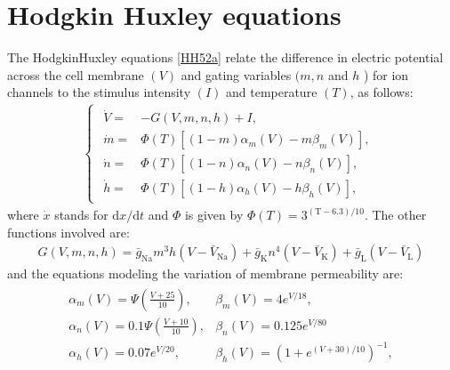 \documentclass[letterpaper,10pt,english]{jupyterBook}
\begin{document}
\chapter{Hodgkin Huxley equations}
\label{\detokenize{HodgkinHuxley:hodgkin-huxley-equations}}\label{\detokenize{HodgkinHuxley::doc}}
\sphinxAtStartPar
The Hodgkin\sphinxhyphen{}Huxley equations {[}\hyperlink{cite.references:id18}{HH52a}{]} relate the
difference in electric potential across the cell membrane \((V)\) and gating
variables \((m, n\) and \(h\) ) for ion channels to the stimulus intensity \((I)\)
and temperature \((T)\), as follows:
\begin{equation}\label{equation:HodgkinHuxley:eq:HHequations}
\begin{split}\begin{cases}
\begin{aligned}
\dot{V} ={}& -G(V, m, n, h)+I, \\
\dot{m} ={}& \Phi(T)\left[(1-m) \alpha_{m}(V)-m \beta_{m}(V)\right], \\
\dot{n} ={}& \Phi(T)\left[(1-n) \alpha_{n}(V)-n \beta_{n}(V)\right], \\
\dot{h} ={}& \Phi(T)\left[(1-h) \alpha_{h}(V)-h \beta_{h}(V)\right],
\end{aligned}
\end{cases}\end{split}
\end{equation}
\sphinxAtStartPar
where \(\dot{x}\) stands for \(\mathrm{d} x / \mathrm{d} t\) and \(\Phi\) is
given by \(\Phi(T)=3^{(\mathrm{T}-6.3) / 10}\). The other functions involved
are:
\begin{equation*}
\begin{split}
G(V, m, n, h)=\bar{g}_{\mathrm{Na}} m^{3}
h\left(V-\bar{V}_{\mathrm{Na}}\right)+\bar{g}_{\mathrm{K}}
n^{4}\left(V-\bar{V}_{\mathrm{K}}\right)+\bar{g}_{\mathrm{L}}\left(V-\bar{V}_{\mathrm{L}}\right)
\end{split}
\end{equation*}
\sphinxAtStartPar
and the equations modeling the variation of membrane permeability are:
\begin{equation*}
\begin{split}
\begin{array}{ll}
\alpha_{m}(V)=\Psi\left(\frac{V+25}{10}\right), & \beta_{m}(V)=4 e^{V / 18},
\\
\alpha_{n}(V)=0.1 \Psi\left(\frac{V+10}{10}\right), & \beta_{n}(V)=0.125 e^{V / 80} \\
\alpha_{h}(V)=0.07 e^{V / 20}, & \beta_{h}(V)=\left(1+e^{(V+30) / 10}\right)^{-1},
\end{array}
\end{split}
\end{equation*}
\end{document}
